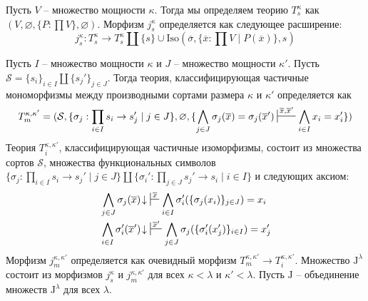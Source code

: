 \documentclass[reqno]{amsart}
\theoremstyle{definition}
\theoremstyle{remark}
\newcommand{\fs}[1]{\mathrm{#1}}
\newcommand{\J}{\mathrm{J}}
\begin{document}
Пусть $V$ -- множество мощности $\kappa$.
Тогда мы определяем теорию $T^\kappa_s$ как $(V, \varnothing, \{ P : \prod V \}, \varnothing)$.
Морфизм $j^\kappa_s$ определяется как следующее расширение:
\[ j^\kappa_s : T^\kappa_s \to T^\kappa_s \amalg \{ s \} \cup \fs{Iso}(\overline{\sigma}, \{ \overline{x} : \prod V \mid P(\overline{x}) \}, s) \]

Пусть $I$ -- множество мощности $\kappa$ и $J$ -- множество мощности $\kappa'$.
Пусть $\mathcal{S} = \{ s_i \}_{i \in I} \amalg \{ s_j' \}_{j \in J}$.
Тогда теория, классифицирующая частичные мономорфизмы между производными сортами размера $\kappa$ и $\kappa'$ определяется как
\[ T_m^{\kappa,\kappa'} = (\mathcal{S}, \{ \sigma_j : \prod_{i \in I} s_i \to s_j' \mid j \in J \}, \varnothing, \{ \bigwedge_{j \in J} \sigma_j(\overline{x}) = \sigma_j(\overline{x}') \sststile{}{\overline{x},\overline{x}'} \bigwedge_{i \in I} x_i = x_i' \}) \]
Теория $T_i^{\kappa,\kappa'}$, классифицирующая частичные изоморфизмы, состоит из множества сортов $\mathcal{S}$, множества функциональных символов $\{ \sigma_j : \prod_{i \in I} s_i \to s_j' \mid j \in J \} \amalg \{ \sigma_i' : \prod_{j \in J} s_j' \to s_i \mid i \in I \}$ и следующих аксиом:
\begin{align*}
& \bigwedge_{j \in J} \sigma_j(\overline{x})\!\downarrow\ \sststile{}{\overline{x}} \bigwedge_{i \in I} \sigma_i'(\{ \sigma_j(x_i) \}_{j \in J}) = x_i \\
& \bigwedge_{i \in I} \sigma_i'(\overline{x}')\!\downarrow\ \sststile{}{\overline{x}'} \bigwedge_{j \in J} \sigma_j(\{ \sigma_i'(x_j') \}_{i \in I}) = x_j'
\end{align*}
Морфизм $j_m^{\kappa,\kappa'}$ определяется как очевидный морфизм $T_m^{\kappa,\kappa'} \to T_i^{\kappa,\kappa'}$.
Множество $\J^\lambda$ состоит из морфизмов $j^\kappa_s$ и $j_m^{\kappa,\kappa'}$ для всех $\kappa < \lambda$ и $\kappa' < \lambda$.
Пусть $\J$ -- объединение множеств $\J^\lambda$ для всех $\lambda$.
\end{document}

